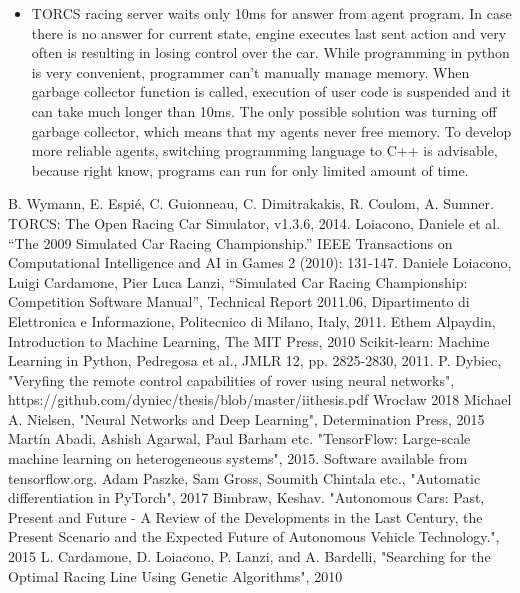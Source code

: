 \documentclass[declaration,shortabstract,english,inz]{iithesis}
\begin{document}
\begin{itemize}
    \item TORCS racing server waits only 10ms for answer from agent program.
In case there is no answer for current state, engine executes last sent action and very often is resulting in losing control over the car.
While programming in python is very convenient, programmer can't manually manage memory.
When garbage collector function is called, execution of user code is suspended and it can take much longer than 10ms.
The only possible solution was turning off garbage collector, which means that my agents never free memory.
To develop more reliable agents, switching programming language to C++ is advisable, because right know, programs can run for only limited amount of time.
\end{itemize}



\begin{thebibliography}{1}
 B. Wymann, E. Espié, C. Guionneau, C. Dimitrakakis, R. Coulom, A. Sumner. TORCS: The Open Racing Car Simulator, v1.3.6, 2014.
 Loiacono, Daniele et al. “The 2009 Simulated Car Racing Championship.” IEEE Transactions on Computational Intelligence and AI in Games 2 (2010): 131-147.
 Daniele Loiacono, Luigi Cardamone, Pier Luca Lanzi, “Simulated Car
Racing Championship: Competition Software Manual”, Technical Report 2011.06, Dipartimento
di Elettronica e Informazione, Politecnico di Milano, Italy, 2011.
 Ethem Alpaydin, Introduction to Machine Learning, The MIT Press, 2010
 Scikit-learn: Machine Learning in Python, Pedregosa et al., JMLR 12, pp. 2825-2830, 2011.
 P. Dybiec, "Veryfing the remote control capabilities of rover using neural networks", https://github.com/dyniec/thesis/blob/master/iithesis.pdf Wrocław 2018
 Michael A. Nielsen, "Neural Networks and Deep Learning", Determination Press, 2015
 Martín Abadi, Ashish Agarwal, Paul Barham etc.
"TensorFlow: Large-scale machine learning on heterogeneous systems",
2015. Software available from tensorflow.org.
 Adam Paszke, Sam Gross, Soumith Chintala etc., "Automatic differentiation in PyTorch", 2017
 Bimbraw, Keshav. "Autonomous Cars: Past, Present and Future - A Review of the Developments in the Last Century, the Present Scenario and the Expected Future of Autonomous Vehicle Technology.", 2015
 L. Cardamone, D. Loiacono, P. Lanzi, and A. Bardelli, "Searching for the Optimal Racing Line Using Genetic Algorithms", 2010


\end{thebibliography}
\end{document}
